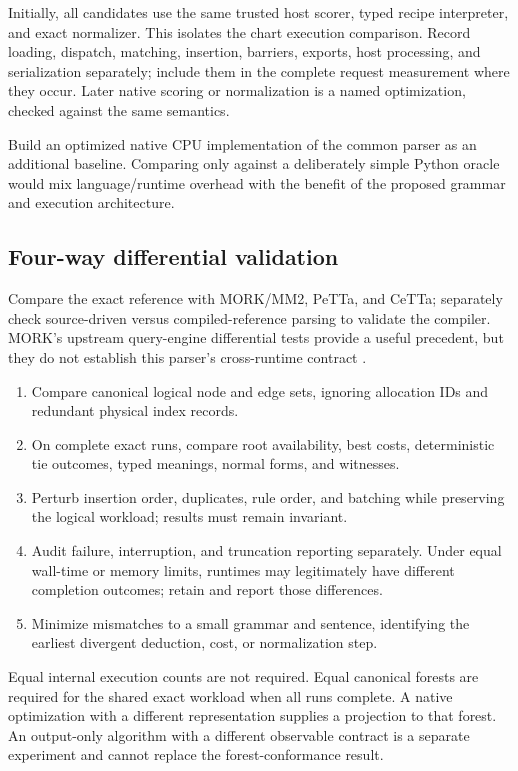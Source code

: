 \documentclass[11pt,a4paper]{article}
\begin{document}
Initially, all candidates use the same trusted host scorer, typed recipe
interpreter, and exact normalizer. This isolates the chart execution
comparison. Record loading, dispatch, matching, insertion, barriers, exports,
host processing, and serialization separately; include them in the complete
request measurement where they occur. Later native scoring or normalization
is a named optimization, checked against the same semantics.

Build an optimized native CPU implementation of the common parser as an
additional baseline. Comparing only against a deliberately simple Python
oracle would mix language/runtime overhead with the benefit of the proposed
grammar and execution architecture.

\subsection{Four-way differential validation}
Compare the exact reference with MORK/MM2, PeTTa, and CeTTa; separately
check source-driven versus compiled-reference parsing to validate the
compiler. MORK's upstream query-engine differential tests provide a useful
precedent, but they do not establish this parser's cross-runtime contract
\cite{morkdiff}.
\begin{enumerate}
  \item Compare canonical logical node and edge sets, ignoring allocation
  IDs and redundant physical index records.
  \item On complete exact runs, compare root availability, best costs,
  deterministic tie outcomes, typed meanings, normal forms, and witnesses.
  \item Perturb insertion order, duplicates, rule order, and batching while
  preserving the logical workload; results must remain invariant.
  \item Audit failure, interruption, and truncation reporting separately.
  Under equal wall-time or memory limits, runtimes may legitimately have
  different completion outcomes; retain and report those differences.
  \item Minimize mismatches to a small grammar and sentence, identifying
  the earliest divergent deduction, cost, or normalization step.
\end{enumerate}
Equal internal execution counts are not required. Equal canonical forests
are required for the shared exact workload when all runs complete. A native
optimization with a different representation supplies a projection to that
forest. An output-only algorithm with a different observable contract is a
separate experiment and cannot replace the forest-conformance result.
\end{document}
